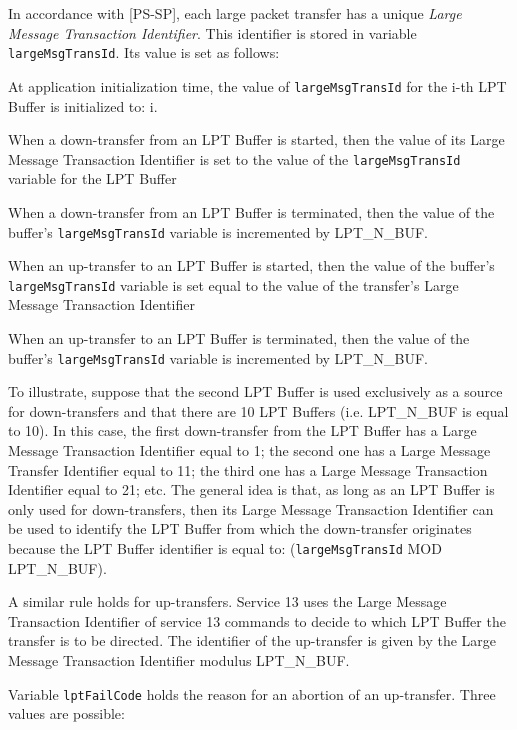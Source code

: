 \documentclass{pnp_article}
\begin{document}
In accordance with [PS-SP], each large packet transfer has a unique \textit{Large Message Transaction Identifier}. This identifier is stored in  variable \texttt{largeMsgTransId}. Its value is set as follows:

\begin{fw_itemize}
\item At application initialization time, the value of \texttt{largeMsgTransId} for the i-th LPT Buffer is initialized to: i.
\item When a down-transfer from an LPT Buffer is started, then the value of its Large Message Transaction Identifier is set to the value of the \texttt{largeMsgTransId} variable for the LPT Buffer
\item When a down-transfer from an LPT Buffer is terminated, then the value of the buffer's \texttt{largeMsgTransId} variable is incremented by LPT\_N\_BUF.
\item When an up-transfer to an LPT Buffer is started, then the value of the buffer's \texttt{largeMsgTransId} variable is set equal to the value of the transfer's Large Message Transaction Identifier
\item When an up-transfer to an LPT Buffer is terminated, then the value of the buffer's \texttt{largeMsgTransId} variable is incremented by LPT\_N\_BUF.
\end{fw_itemize}

To illustrate, suppose that the second LPT Buffer is used exclusively as a source for down-transfers and that there are 10 LPT Buffers (i.e. LPT\_N\_BUF is equal to 10). In this case, the first down-transfer from the LPT Buffer has a Large Message Transaction Identifier equal to 1; the second one has a Large Message Transfer Identifier equal to 11; the third one has a Large Message Transaction Identifier equal to 21; etc. The general idea is that, as long as an LPT Buffer is only used for down-transfers, then its Large Message Transaction Identifier can be used to identify the LPT Buffer from which the down-transfer originates because the LPT Buffer identifier is equal to: (\texttt{largeMsgTransId} MOD LPT\_N\_BUF).

A similar rule holds for up-transfers. Service 13 uses the Large Message Transaction Identifier of service 13 commands to decide to which LPT Buffer the transfer is to be directed. The identifier of the up-transfer is given by the Large Message Transaction Identifier modulus LPT\_N\_BUF.

Variable \texttt{lptFailCode} holds the reason for an abortion of an up-transfer. Three values are possible:
\end{document}
